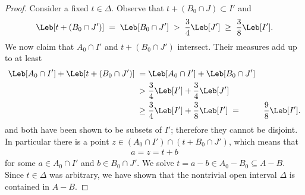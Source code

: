 \begin{proof}
  Consider a fixed $t \in \Delta$.
  Observe that $t + (B_0 \cap J) \subset I'$ and
  \begin{align*}
    \Leb[t + (B_0 \cap J')] \; = \; \Leb[B_0 \cap J']
      \; > \; \frac{3}{4} \Leb[J'] \; \ge \; \frac{3}{8} \Leb[I'] .
  \end{align*}
  We now claim that $A_0 \cap I'$ and $t + (B_0 \cap J')$ intersect.
  Their measures add up to at least
  \begin{align*}
    \Leb[A_0 \cap I'] + \Leb[t + (B_0 \cap J')]
    \; = \; & \Leb[A_0 \cap I'] + \Leb[B_0 \cap J'] \\
    \; > \; & \frac{3}{4} \Leb[I'] + \frac{3}{4} \Leb[J'] \\
    \; \ge \; & \frac{3}{4} \Leb[I'] + \frac{3}{8} \Leb[I']
    \; = \; & \frac{9}{8} \Leb[I'] .
  \end{align*}
  and both have been shown to be subsets of $I'$; therefore they
  cannot be disjoint.
  In particular there is a point $z \in (A_0 \cap I') \cap (t + B_0 \cap J')$,
  which means that
  \begin{align*}
    a = z = t + b
  \end{align*}
  for some $a \in A_0 \cap I'$ and $b \in B_0 \cap J'$. We solve
  $t = a - b \in A_0 - B_0 \subseteq A - B$. Since $t \in \Delta$
  was arbitrary, we have shown that the nontrivial open interval $\Delta$
  is contained in $A - B$.
\end{proof}
